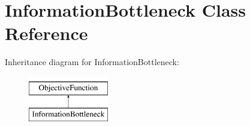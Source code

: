 \hypertarget{classInformationBottleneck}{\section{Information\-Bottleneck Class Reference}
\label{classInformationBottleneck}
}
Inheritance diagram for Information\-Bottleneck\-:\begin{figure}[H]
\begin{center}
\leavevmode
\includegraphics[height=2.000000cm]{classInformationBottleneck}
\end{center}
\end{figure}
